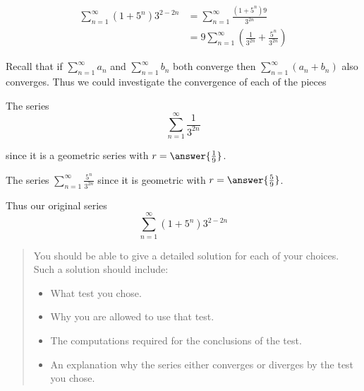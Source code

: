 \documentclass{ximera}
\begin{document}
\begin{exercise}
\begin{hint}
\begin{question}
\begin{align*}
\sum^{\infty}_{n=1} (1+5^n)3^{2-2n}&=\sum^{\infty}_{n=1}\frac{(1+5^n)9}{3^{2n}} \\
&=9\sum^{\infty}_{n=1} \left( \frac{1}{3^{2n}} + \frac{5^n}{3^{2n}} \right)
\end{align*}

Recall that if $\sum^{\infty}_{n=1} a_n$ and $\sum^{\infty}_{n=1} b_n$ both converge then $\sum^{\infty}_{n=1} \left( a_n+b_n \right)$ also converges. Thus we could investigate the convergence of each of the pieces

The series
\[
\sum^{\infty}_{n=1} \frac{1}{3^{2n}}
\]

 since it is a geometric series with $r=\answer{ \frac{1}{9}}$. 

The series $\sum^{\infty}_{n=1} \frac{5^n}{3^{2n}}$   
since it is geometric with $r=\answer{\frac{5}{9}}$. 

Thus our original series
\[
\sum_{n=1}^{\infty}(1+5^n)3^{2-2n}
\]

\begin{multipleChoice}
\end{multipleChoice}

\end{question}
\end{hint}







\begin{quote}
You should be able to give a detailed solution for each of your choices.  Such a solution should include:

\begin{itemize}
\item What test you chose.
\item Why you are allowed to use that test.
\item The computations required for the conclusions of the test.
\item An explanation why the series either converges or diverges by the test you chose.
\end{itemize}

\end{quote}


\end{exercise}
\end{document}
